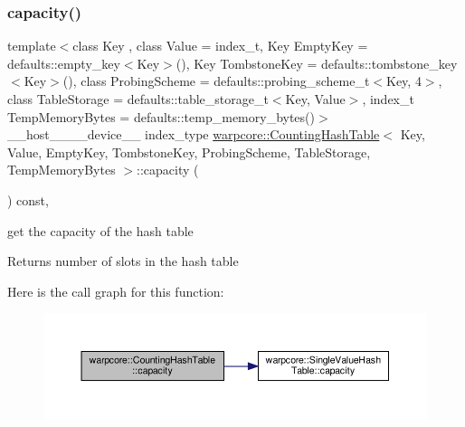 \subsubsection{\texorpdfstring{capacity()}{capacity()}}
{\footnotesize\ttfamily template$<$class Key , class Value  = index\+\_\+t, Key Empty\+Key = defaults\+::empty\+\_\+key$<$\+Key$>$(), Key Tombstone\+Key = defaults\+::tombstone\+\_\+key$<$\+Key$>$(), class Probing\+Scheme  = defaults\+::probing\+\_\+scheme\+\_\+t$<$\+Key, 4$>$, class Table\+Storage  = defaults\+::table\+\_\+storage\+\_\+t$<$\+Key, Value$>$, index\+\_\+t Temp\+Memory\+Bytes = defaults\+::temp\+\_\+memory\+\_\+bytes()$>$ \\
\+\_\+\+\_\+host\+\_\+\+\_\+\+\_\+\+\_\+device\+\_\+\+\_\+ index\+\_\+type \hyperlink{classwarpcore_1_1CountingHashTable}{warpcore\+::\+Counting\+Hash\+Table}$<$ Key, Value, Empty\+Key, Tombstone\+Key, Probing\+Scheme, Table\+Storage, Temp\+Memory\+Bytes $>$\+::capacity (\begin{DoxyParamCaption}{ }\end{DoxyParamCaption}) const\hspace{0.3cm}{\ttfamily [inline]}, {\ttfamily [noexcept]}}



get the capacity of the hash table 

\begin{DoxyReturn}{Returns}
number of slots in the hash table 
\end{DoxyReturn}
Here is the call graph for this function\+:
\nopagebreak
\begin{figure}[H]
\begin{center}
\leavevmode
\includegraphics[width=350pt]{classwarpcore_1_1CountingHashTable_a05cdc2ffc3c11c2b10d90b3d8812e96d_cgraph}
\end{center}
\end{figure}
\mbox{\label{classwarpcore_1_1CountingHashTable_aeaf1b333eb176da987dee4d003e5dddc}} 
